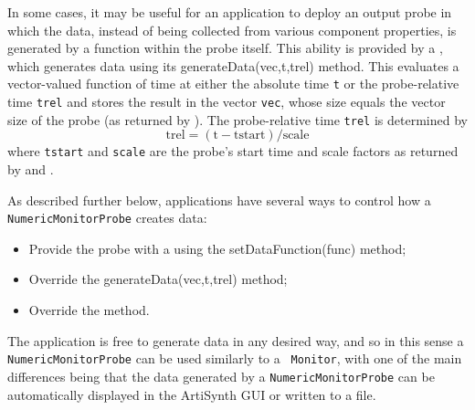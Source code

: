 In some cases, it may be useful for an application to deploy an output
probe in which the data, instead of being collected from various
component properties, is generated by a function within the probe
itself. This ability is provided by a
, which generates
data using its  %
{generateData(vec,t,trel)}
method. This evaluates a vector-valued function of time at
either the absolute time {\tt t} or the probe-relative time {\tt trel}
and stores the result in the vector {\tt vec}, whose size equals the
vector size of the probe (as returned by
).  The
probe-relative time {\tt trel} is determined by
%
\begin{equation}
\text{trel} = (\text{t} - \text{tstart})/\text{scale}
\end{equation}
%
where {\tt tstart} and {\tt scale} are the probe's start time
and scale factors as returned by
 and
.

As described further below, applications have several ways to control
how a {\tt NumericMonitorProbe} creates data:

\begin{itemize}

\item Provide the probe with a
 using the
%
{setDataFunction(func)} method;

\item Override the %
{generateData(vec,t,trel)}
method;

\item Override the 
method.

\end{itemize}

The application is free to generate data in any desired way, and so in
this sense a {\tt NumericMonitorProbe} can be used similarly to a {\tt
Monitor}, with one of the main differences being that the data
generated by a {\tt NumericMonitorProbe} can be automatically displayed
in the ArtiSynth GUI or written to a file.

